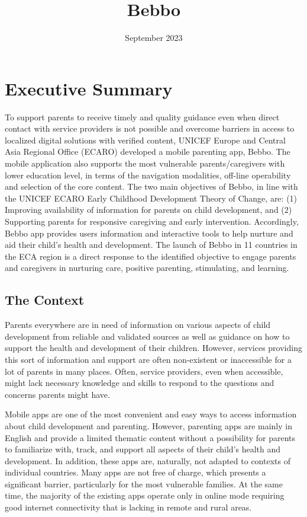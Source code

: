\documentclass{article}
\title{Bebbo}
\date{September 2023}
\begin{document}
\tableofcontents

\clearpage
\section{Executive Summary}

To support parents to receive timely and quality guidance even when direct contact with service  providers is not possible and overcome barriers in access to localized digital solutions with verified  content, UNICEF Europe and Central Asia Regional Office (ECARO) developed a mobile parenting app,  Bebbo. The mobile application also supports the most vulnerable parents/caregivers with lower  education level, in terms of the navigation modalities, off-line operability and selection of the core  content. The two main objectives of Bebbo, in line with the UNICEF ECARO Early Childhood  Development Theory of Change, are: (1) Improving availability of information for parents on child  development, and (2) Supporting parents for responsive caregiving and early intervention.  Accordingly, Bebbo app provides users information and interactive tools to help nurture and aid their  child’s health and development. The launch of Bebbo in 11 countries in the ECA region is a direct  response to the identified objective to engage parents and caregivers in nurturing care, positive  parenting, stimulating, and learning.

\subsection*{The Context}
Parents everywhere are in need of information on various aspects of child development from reliable  and validated sources as well as guidance on how to support the health and development of their  children. However, services providing this sort of information and support are often non-existent or  inaccessible for a lot of parents in many places. Often, service providers, even when accessible, might  lack necessary knowledge and skills to respond to the questions and concerns parents might have.

Mobile apps are one of the most convenient and easy ways to access information about child  development and parenting. However, parenting apps are mainly in English and provide a limited  thematic content without a possibility for parents to familiarize with, track, and support all aspects of  their child’s health and development. In addition, these apps are, naturally, not adapted to contexts of  individual countries. Many apps are not free of charge, which presents a significant barrier, particularly  for the most vulnerable families. At the same time, the majority of the existing apps operate only in  online mode requiring good internet connectivity that is lacking in remote and rural areas.
\end{document}

